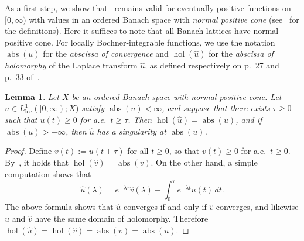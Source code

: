 \documentclass[sn-mathphys]{sn-jnl}%
\theoremstyle{thmstyleone}
\newtheorem{lemma}[theorem]{Lemma}
\theoremstyle{thmstylethree}
\DeclareMathOperator{\abs}{abs}
\DeclareMathOperator{\hol}{hol}
\begin{document}
As a first step, we show that~\cite[Theorem 1.5.3]{ABHN} remains valid for eventually positive functions on $[0,\infty)$ with values in an ordered Banach space with \emph{normal positive cone} (see~\cite[Appendix C]{ABHN} for the definitions). Here it suffices to note that all Banach lattices have normal positive cone. For locally Bochner-integrable functions, we use the notation $\abs(u)$ for the \emph{abscissa of convergence} and $\hol(\hat{u})$ for the \emph{abscissa of holomorphy} of the Laplace transform $\hat{u}$, as defined respectively on p.~27 and p.~33 of~\cite{ABHN}.
\begin{lemma}
	\label{lem:hol=abs}
	Let $X$ be an ordered Banach space with normal positive cone. Let $u\in L^1_{\mathrm{loc}}([0,\infty);X)$ satisfy $\abs(u)<\infty$, and suppose that there exists $\tau\ge 0$ such that $u(t)\ge 0$ for a.e.\ $t\ge\tau$. Then $\hol(\hat{u})=\abs(u)$, and if $\abs(u)>-\infty$, then $\hat{u}$ has a singularity at $\abs(u)$.
\end{lemma}
\begin{proof}
	Define $v(t):=u(t+\tau)$ for all $t\ge 0$, so that $v(t)\ge 0$ for a.e.\ $t\ge 0$. By~\cite[Theorem 1.5.3]{ABHN}, it holds that $\hol(\hat{v})=\abs(v)$. On the other hand, a simple computation shows that
	\begin{equation}
		\hat{u}(\lambda) = e^{-\lambda\tau} \hat{v}(\lambda) + \int_0^\tau e^{-\lambda t}u(t)\,dt.
	\end{equation}
	The above formula shows that $\hat{u}$ converges if and only if $\hat{v}$ converges, and likewise $\hat{u}$ and $\hat{v}$ have the same domain of holomorphy. Therefore $\hol(\hat{u})=\hol(\hat{v})=\abs(v)=\abs(u)$.
\end{proof}
\end{document}

